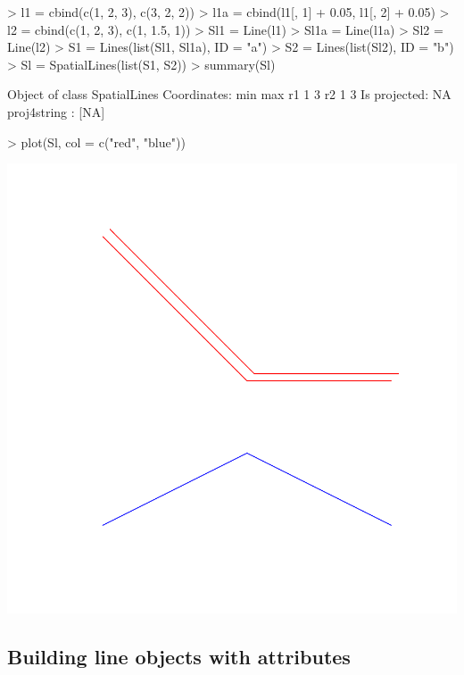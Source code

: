 \documentclass{article}
\begin{document}
\begin{Schunk}
\begin{Sinput}
> l1 = cbind(c(1, 2, 3), c(3, 2, 2))
> l1a = cbind(l1[, 1] + 0.05, l1[, 2] + 0.05)
> l2 = cbind(c(1, 2, 3), c(1, 1.5, 1))
> Sl1 = Line(l1)
> Sl1a = Line(l1a)
> Sl2 = Line(l2)
> S1 = Lines(list(Sl1, Sl1a), ID = "a")
> S2 = Lines(list(Sl2), ID = "b")
> Sl = SpatialLines(list(S1, S2))
> summary(Sl)
\end{Sinput}
\begin{Soutput}
Object of class SpatialLines
Coordinates:
   min max
r1   1   3
r2   1   3
Is projected: NA 
proj4string : [NA]
\end{Soutput}
\begin{Sinput}
> plot(Sl, col = c("red", "blue"))
\end{Sinput}
\end{Schunk}
\includegraphics{sp-021}

\subsection{Building line objects with attributes}
\end{document}
